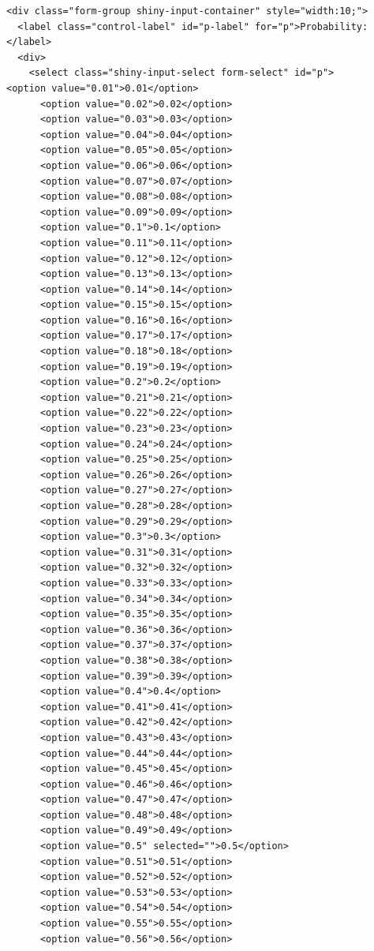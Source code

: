 \documentclass[
  letterpaper,
  DIV=11,
  numbers=noendperiod]{scrartcl}
\begin{document}
\label{input_selects_1-2}
\begin{verbatim}
<div class="form-group shiny-input-container" style="width:10;">
  <label class="control-label" id="p-label" for="p">Probability:</label>
  <div>
    <select class="shiny-input-select form-select" id="p">      <option value="0.01">0.01</option>
      <option value="0.02">0.02</option>
      <option value="0.03">0.03</option>
      <option value="0.04">0.04</option>
      <option value="0.05">0.05</option>
      <option value="0.06">0.06</option>
      <option value="0.07">0.07</option>
      <option value="0.08">0.08</option>
      <option value="0.09">0.09</option>
      <option value="0.1">0.1</option>
      <option value="0.11">0.11</option>
      <option value="0.12">0.12</option>
      <option value="0.13">0.13</option>
      <option value="0.14">0.14</option>
      <option value="0.15">0.15</option>
      <option value="0.16">0.16</option>
      <option value="0.17">0.17</option>
      <option value="0.18">0.18</option>
      <option value="0.19">0.19</option>
      <option value="0.2">0.2</option>
      <option value="0.21">0.21</option>
      <option value="0.22">0.22</option>
      <option value="0.23">0.23</option>
      <option value="0.24">0.24</option>
      <option value="0.25">0.25</option>
      <option value="0.26">0.26</option>
      <option value="0.27">0.27</option>
      <option value="0.28">0.28</option>
      <option value="0.29">0.29</option>
      <option value="0.3">0.3</option>
      <option value="0.31">0.31</option>
      <option value="0.32">0.32</option>
      <option value="0.33">0.33</option>
      <option value="0.34">0.34</option>
      <option value="0.35">0.35</option>
      <option value="0.36">0.36</option>
      <option value="0.37">0.37</option>
      <option value="0.38">0.38</option>
      <option value="0.39">0.39</option>
      <option value="0.4">0.4</option>
      <option value="0.41">0.41</option>
      <option value="0.42">0.42</option>
      <option value="0.43">0.43</option>
      <option value="0.44">0.44</option>
      <option value="0.45">0.45</option>
      <option value="0.46">0.46</option>
      <option value="0.47">0.47</option>
      <option value="0.48">0.48</option>
      <option value="0.49">0.49</option>
      <option value="0.5" selected="">0.5</option>
      <option value="0.51">0.51</option>
      <option value="0.52">0.52</option>
      <option value="0.53">0.53</option>
      <option value="0.54">0.54</option>
      <option value="0.55">0.55</option>
      <option value="0.56">0.56</option>

\end{verbatim}
\end{document}
